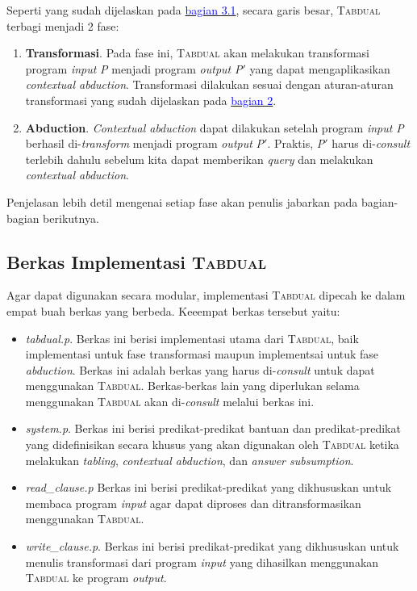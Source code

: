 Seperti yang sudah dijelaskan pada \hyperref[fase]{\textcolor{blue}{bagian 3.1}}, secara garis besar, \textsc{Tabdual} terbagi menjadi 2 fase:

\begin{enumerate}
	\item \textbf{Transformasi}. Pada fase ini, \textsc{Tabdual} akan melakukan transformasi program \textit{input} \textit{P} menjadi program \textit{output} \textit{P$'$} yang dapat mengaplikasikan \textit{contextual abduction}. Transformasi dilakukan sesuai dengan aturan-aturan transformasi yang sudah dijelaskan pada \hyperref[bab2]{\textcolor{blue}{bagian 2}}.
	\item \textbf{Abduction}. \textit{Contextual abduction} dapat dilakukan setelah program \textit{input} \textit{P} berhasil di-\textit{transform} menjadi program \textit{output} \textit{P$'$}. Praktis, \textit{P$'$} harus di-\textit{consult} terlebih dahulu sebelum kita dapat memberikan \textit{query} dan melakukan \textit{contextual abduction}.
\end{enumerate}

Penjelasan lebih detil mengenai setiap fase akan penulis jabarkan pada bagian-bagian berikutnya.

\subsection{Berkas Implementasi \textsc{Tabdual}}
Agar dapat digunakan secara modular, implementasi \textsc{Tabdual} dipecah ke dalam empat buah berkas yang berbeda. Keeempat berkas tersebut yaitu:

\begin{itemize}
	\item \textit{tabdual.p}. Berkas ini berisi implementasi utama dari \textsc{Tabdual}, baik implementasi untuk fase transformasi maupun implementsai untuk fase \textit{abduction}. Berkas ini adalah berkas yang harus di-\textit{consult} untuk dapat menggunakan \textsc{Tabdual}. Berkas-berkas lain yang diperlukan selama menggunakan \textsc{Tabdual} akan di-\textit{consult} melalui berkas ini.
	\item \textit{system.p}. Berkas ini berisi predikat-predikat bantuan dan predikat-predikat yang didefinisikan secara khusus yang akan digunakan  oleh \textsc{Tabdual} ketika melakukan \textit{tabling}, \textit{contextual abduction}, dan \textit{answer subsumption}. 
	\item \textit{read\_clause.p} Berkas ini berisi predikat-predikat yang dikhususkan untuk membaca program \textit{input} agar dapat diproses dan ditransformasikan menggunakan \textsc{Tabdual}.
	\item \textit{write\_clause.p}. Berkas ini berisi predikat-predikat yang dikhususkan untuk menulis transformasi dari program \textit{input} yang dihasilkan menggunakan \textsc{Tabdual} ke program \textit{output}.
\end{itemize}

